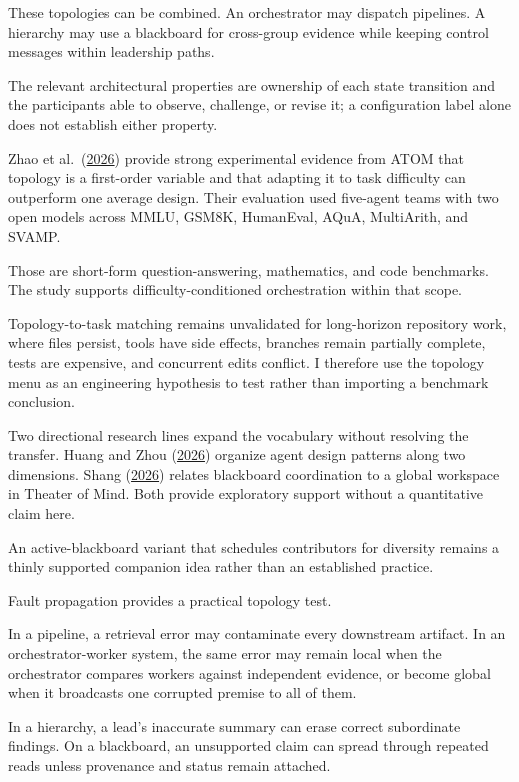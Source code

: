 These topologies can be combined. An orchestrator may dispatch pipelines. A hierarchy may use a blackboard for cross-group evidence while keeping control messages within leadership paths.

The relevant architectural properties are ownership of each state transition and the participants able to observe, challenge, or revise it; a configuration label alone does not establish either property.

Zhao et al.~(\href{https://arxiv.org/abs/2605.26178}{2026}) provide strong experimental evidence from ATOM that topology is a first-order variable and that adapting it to task difficulty can outperform one average design. Their evaluation used five-agent teams with two open models across MMLU, GSM8K, HumanEval, AQuA, MultiArith, and SVAMP.

Those are short-form question-answering, mathematics, and code benchmarks. The study supports difficulty-conditioned orchestration within that scope.

Topology-to-task matching remains unvalidated for long-horizon repository work, where files persist, tools have side effects, branches remain partially complete, tests are expensive, and concurrent edits conflict. I therefore use the topology menu as an engineering hypothesis to test rather than importing a benchmark conclusion.

Two directional research lines expand the vocabulary without resolving the transfer. Huang and Zhou (\href{https://arxiv.org/abs/2605.13850}{2026}) organize agent design patterns along two dimensions. Shang (\href{https://arxiv.org/abs/2604.08206}{2026}) relates blackboard coordination to a global workspace in Theater of Mind. Both provide exploratory support without a quantitative claim here.

An active-blackboard variant that schedules contributors for diversity remains a thinly supported companion idea rather than an established practice.

Fault propagation provides a practical topology test.

In a pipeline, a retrieval error may contaminate every downstream artifact. In an orchestrator-worker system, the same error may remain local when the orchestrator compares workers against independent evidence, or become global when it broadcasts one corrupted premise to all of them.

In a hierarchy, a lead's inaccurate summary can erase correct subordinate findings. On a blackboard, an unsupported claim can spread through repeated reads unless provenance and status remain attached.

